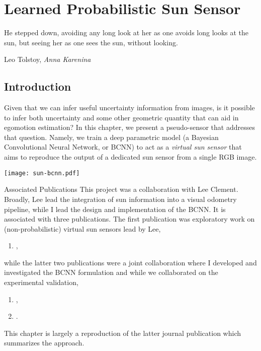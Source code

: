 \chapter{Learned Probabilistic Sun Sensor}
\epigraph{He stepped down, avoiding any long look at her as one avoids long looks at the sun, but seeing her as one sees the sun, without looking.}{Leo Tolstoy, \textit{Anna Karenina}}
\label{ch:sun-bcnn}

\section{Introduction}

Given that we can infer useful uncertainty information from images, is it possible to infer both uncertainty and some other geometric quantity that can aid in egomotion estimation? In this chapter, we present a pseudo-sensor that addresses that question. Namely, we train a deep parametric model (a Bayesian Convolutional Neural Network, or BCNN) to act as a \textit{virtual sun sensor} that aims to reproduce the output of a dedicated sun sensor from a single RGB image. 


\begin{figure*}[h!]
\centering
\texttt{[image: sun-bcnn.pdf]}
 \caption{Sun-BCNN is a learned virtual sun sensor that outputs sun direction with an associated uncertainty based on a single RGB image. We use this as a source of orientation information within a privileged reference frame.}
 \label{fig:sun-bcnn_intro_fig}
\end{figure*}

\begin{remark}{Associated Publications}
This project was a collaboration with Lee Clement. Broadly, Lee lead the integration of sun information into a visual odometry pipeline, while I lead the design and implementation of the BCNN. It is associated with three publications. The first publication was exploratory work on (non-probabilistic) virtual sun sensors lead by Lee,
\begin{enumerate}
\item {},
\end{enumerate}
while the latter two publications were a joint collaboration where I developed and investigated the BCNN formulation and while we collaborated on the experimental validation,
\begin{enumerate}[resume]
\item {},
\item {}.
\end{enumerate}
This chapter is largely a reproduction of the latter journal publication which summarizes the approach.
\end{remark} 

